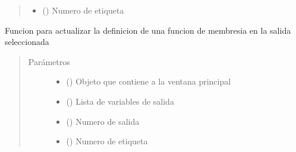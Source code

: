 \documentclass[letterpaper,10pt,spanish]{sphinxmanual}
\begin{document}
\begin{fulllineitems}
\begin{fulllineitems}
\begin{quote}
\begin{description}
\begin{itemize}
\item {} 
 () \textendash{} Numero de etiqueta

\end{itemize}

\end{description}\end{quote}

\end{fulllineitems}


\begin{fulllineitems}
\label{\detokenize{codigos/rutinas_fuzzy:rutinas_fuzzy.FuzzyController.update_definicion_output}}
Funcion para actualizar la definicion de una funcion de membresia en la salida seleccionada
\begin{quote}\begin{description}
\item[{Parámetros}] \leavevmode\begin{itemize}
\item {} 
 () \textendash{} Objeto que contiene a la ventana principal

\item {} 
 () \textendash{} Lista de variables de salida

\item {} 
 () \textendash{} Numero de salida

\item {} 
 () \textendash{} Numero de etiqueta

\end{itemize}

\end{description}\end{quote}

\end{fulllineitems}


\end{fulllineitems}
\end{document}
